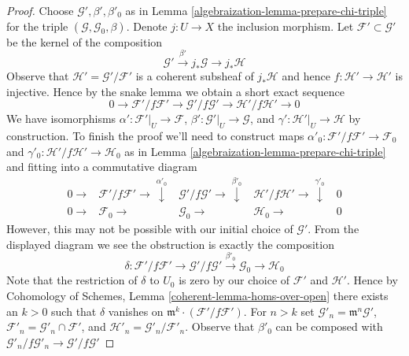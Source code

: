 \begin{proof}

Choose $\mathcal{G}', \beta', \beta'_0$ as in
Lemma \ref{algebraization-lemma-prepare-chi-triple}
for the triple $(\mathcal{G}, \mathcal{G}_0, \beta)$.
Denote $j : U \to X$ the inclusion morphism.
Let $\mathcal{F}' \subset \mathcal{G}'$
be the kernel of the composition
$$
\mathcal{G}' \xrightarrow{\beta'} j_*\mathcal{G} \to j_*\mathcal{H}
$$
Observe that $\mathcal{H}' = \mathcal{G}'/\mathcal{F}'$
is a coherent subsheaf of $j_*\mathcal{H}$ and hence
$f : \mathcal{H}' \to \mathcal{H}'$ is injective.
Hence by the snake lemma we obtain a short exact sequence
$$
0 \to \mathcal{F}'/f\mathcal{F}' \to
\mathcal{G}'/f\mathcal{G}' \to
\mathcal{H}'/f\mathcal{H}' \to 0
$$
We have isomorphisms
$\alpha' : \mathcal{F}'|_U \to \mathcal{F}$,
$\beta' : \mathcal{G}'|_U \to \mathcal{G}$, and
$\gamma' : \mathcal{H}'|_U \to \mathcal{H}$ by construction.
To finish the proof we'll need to construct maps
$\alpha'_0 : \mathcal{F}'/f\mathcal{F}' \to \mathcal{F}_0$ and
$\gamma'_0 : \mathcal{H}'/f\mathcal{H}' \to \mathcal{H}_0$ as in
Lemma \ref{algebraization-lemma-prepare-chi-triple} and fitting into
a commutative diagram
$$
\begin{array}{ccccc}0 \longrightarrow & \mathcal{F}'/f\mathcal{F}' \longrightarrow\overset{\alpha'_0}{\downarrow} & \mathcal{G}'/f\mathcal{G}' \longrightarrow\overset{\beta'_0}{\downarrow} & \mathcal{H}'/f\mathcal{H}' \longrightarrow\overset{\gamma'_0}{\downarrow} & 0 \\ 0 \longrightarrow & \mathcal{F}_0 \longrightarrow & \mathcal{G}_0 \longrightarrow & \mathcal{H}_0 \longrightarrow & 0\end{array}
$$
However, this may not be possible with our initial choice of $\mathcal{G}'$.
From the displayed diagram we see the obstruction is
exactly the composition
$$
\delta :
\mathcal{F}'/f\mathcal{F}' \to
\mathcal{G}'/f\mathcal{G}' \xrightarrow{\beta'_0}
\mathcal{G}_0 \to
\mathcal{H}_0
$$
Note that the restriction of $\delta$ to $U_0$ is zero by our choice of
$\mathcal{F}'$ and $\mathcal{H}'$. Hence by
Cohomology of Schemes, Lemma \ref{coherent-lemma-homs-over-open}
there exists an $k > 0$ such that
$\delta$ vanishes on $\mathfrak m^k \cdot (\mathcal{F}'/f\mathcal{F}')$.
For $n > k$ set $\mathcal{G}'_n = \mathfrak m^n \mathcal{G}'$,
$\mathcal{F}'_n = \mathcal{G}'_n \cap \mathcal{F}'$, and
$\mathcal{H}'_n = \mathcal{G}'_n/\mathcal{F}'_n$.
Observe that $\beta'_0$ can be composed with
$\mathcal{G}'_n/f\mathcal{G}'_n \to \mathcal{G}'/f\mathcal{G}'$

\end{proof}
